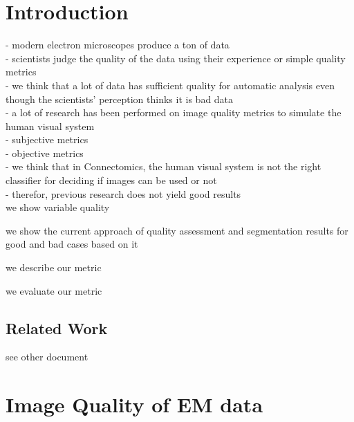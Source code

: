 \documentclass{llncs}
\begin{document}
%
\section{Introduction}
- modern electron microscopes produce a ton of data\\
- scientists judge the quality of the data using their experience or simple quality metrics\\
- we think that a lot of data has sufficient quality for automatic analysis even though the scientists' perception thinks it is bad data\\
- a lot of research has been performed on image quality metrics to simulate the human visual system\\
- subjective metrics\\
- objective metrics\\
- we think that in Connectomics, the human visual system is not the right classifier for deciding if images can be used or not\\
- therefor, previous research does not yield good results\\

we show variable quality

we show the current approach of quality assessment and segmentation results for good and bad cases based on it

we describe our metric

we evaluate our metric





%
%
\subsection{Related Work}
%
%
%
%
see other document



\section{Image Quality of EM data}
\end{document}
